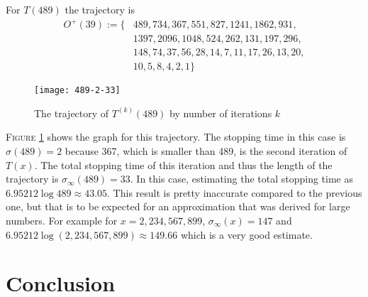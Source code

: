\documentclass[12pt,a4paper,reqno]{amsart}
\begin{document}
For $T(489)$ the trajectory is 
\begin{align}
    \nonumber
    O^+(39):=\{&489,734,367,551,827,1241,1862,931,\\
               &1397,2096,1048,524,262,131,197,296,\\ \nonumber
               &148,74,37,56,28,14,7,11,17,26,13,20,\\ \nonumber
               &10, 5, 8, 4, 2, 1\}
\end{align}
\begin{figure}[h]
\texttt{[image: 489-2-33]}
    \caption{The trajectory of $T^{(k)}(489)$ by number of iterations $k$}
\label{fig:03}
\end{figure}
\textsc{Figure} \ref{fig:03} shows the graph for this trajectory. The stopping
time in this case is $\sigma(489)=2$ because 367, which is smaller than 489, is
the second iteration of $T(x)$. The total stopping time of this iteration and
thus the length of the trajectory is $\sigma_{\infty}(489)=33$.
In this case, estimating the total stopping time as $6.95212 \log 489 \approx
43.05$. This result is pretty inaccurate compared to the previous one, but that
is to be expected for an approximation that was derived for large numbers. 
For example for $x=2,234,567,899$, $\sigma_{\infty}(x)=147$ and $6.95212 \log
(2,234,567,899) \approx 149.66$ which is a very good estimate.

\section{Conclusion}
\end{document}

